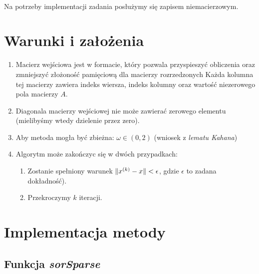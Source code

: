 \documentclass{article}
\DeclarePairedDelimiter{\norm}{\lVert}{\rVert}
\begin{document}
\paragraph{}
Na potrzeby implementacji zadania posłużymy się zapisem niemacierzowym.

\section{Warunki i założenia}
\begin{enumerate}
\item Macierz wejściowa jest w formacie, który pozwala przyspieszyć obliczenia oraz zmniejszyć złożoność pamięciową dla macierzy rozrzedzonych
 Każda kolumna tej macierzy zawiera indeks wiersza, indeks kolumny oraz wartość niezerowego pola macierzy $A$.
\item Diagonala macierzy wejściowej nie może zawierać zerowego elementu (mielibyśmy wtedy dzielenie przez zero). 
\item Aby metoda mogła być zbieżna: $\omega \in (0,2)$ (wniosek z \textit{lematu Kahana})
\item Algorytm może zakończyc się w dwóch przypadkach:
\begin {enumerate}
\item Zostanie spełniony warunek $\norm{x^{(k)}-x}<\epsilon$, gdzie $\epsilon$ to zadana\\ dokładność).
\item Przekroczymy $k$ iteracji.
\end {enumerate}
\end{enumerate}

\section{Implementacja metody}
\subsection{Funkcja \textit{sorSparse}}
\end{document}
